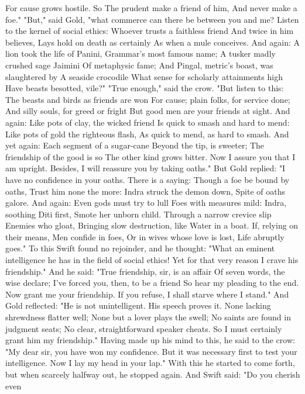 \documentclass{book}
\begin{document}
For cause grows hostile. So
The prudent make a friend of him,
And never make a foe."
"But," said Gold, "what commerce can there be
between you and me? Listen to the kernel of social
ethics:
Whoever trusts a faithless friend
And twice in him believes,
Lays hold on death as certainly
As when a mule conceives.
And again:
A lion took the life of Panini,
Grammar's most famous name;
A tusker madly crushed sage Jaimini
Of metaphysic fame;
And Pingal, metric's boast, was slaughtered by
A seaside crocodile
What sense for scholarly attainments high
Have beasts besotted, vile?"
"True enough," said the crow. "But listen to this:
The beasts and birds as friends are won
For cause; plain folks, for service done;
And silly souls, for greed or fright
But good men are your friends at sight.
And again:
Like pots of clay, the wicked friend
Is quick to smash and hard to mend:
Like pots of gold the righteous flash,
As quick to mend, as hard to smash.
And yet again:
Each segment of a sugar-cane
Beyond the tip, is sweeter;
The friendship of the good is so
The other kind grows bitter.
Now I assure you that I am upright. Besides, I will
reassure you by taking oaths."
But Gold replied: "I have no confidence in your
oaths. There is a saying:
Though a foe be bound by oaths,
Trust him none the more:
Indra struck the demon down,
Spite of oaths galore.
And again:
Even gods must try to lull
Foes with measures mild:
Indra, soothing Diti first,
Smote her unborn child.
Through a narrow crevice slip
Enemies who gloat,
Bringing slow destruction, like
Water in a boat.
If, relying on their means,
Men confide in foes,
Or in wives whose love is lost,
Life abruptly goes."
To this Swift found no rejoinder, and he thought:
"What an eminent intelligence he has in the field of
social ethics! Yet for that very reason I crave his
friendship." And he said:
"True friendship, sir, is an affair
Of seven words, the wise declare;
I've forced you, then, to be a friend
So hear my pleading to the end.
Now grant me your friendship. If you refuse, I shall
starve where I stand."
And Gold reflected: "He is not unintelligent. His
speech proves it.
None lacking shrewdness flatter well;
None but a lover plays the swell;
No saints are found in judgment seats;
No clear, straightforward speaker cheats.
So I must certainly grant him my friendship."
Having made up his mind to this, he said to the
crow: "My dear sir, you have won my confidence.
But it was necessary first to test your intelligence.
Now I lay my head in your lap." With this he started
to come forth, but when scarcely halfway out, he
stopped again. And Swift said: "Do you cherish even
\end{document}
